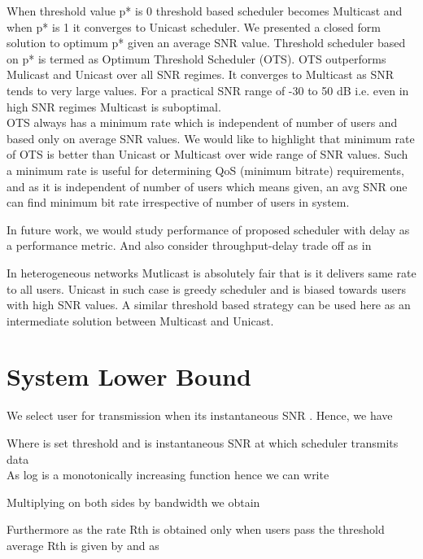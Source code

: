 \documentclass[conference]{IEEEtran}
\begin{document}
When threshold value p* is 0 threshold based scheduler becomes Multicast and when p* is 1 it converges to Unicast scheduler. We presented a closed form solution to optimum p* given an average SNR value. Threshold scheduler based on p* is termed as Optimum Threshold Scheduler (OTS). OTS outperforms Mulicast and Unicast over all SNR regimes. It converges to Multicast as SNR tends to very large values.
For a practical SNR range of -30 to 50 dB     i.e. even in high SNR regimes Multicast is suboptimal. \\

OTS always has a minimum rate which is independent of number of users and based only on average SNR values. We would like to highlight that minimum rate of OTS is better than Unicast or Multicast over wide range of SNR values. Such a minimum rate is useful for determining QoS (minimum bitrate) requirements, and as it is independent of number of users which means given, an avg SNR one can find minimum bit rate irrespective of number of users in system.

In future work, we would study performance of proposed scheduler with delay as a performance metric. And also consider throughput-delay trade off as in \cite{Praveenkumar_throuputdelay}

In heterogeneous networks Mutlicast is absolutely fair that is it delivers same rate to all users. Unicast in such case is greedy scheduler and is biased towards users with high SNR values.  A similar threshold based strategy can be used here as an intermediate solution between Multicast and Unicast.




\nocite{OMS}
\appendix

\section{System Lower Bound}
\label{Appendix: lower bound}
We select user for transmission when its instantaneous SNR  .
Hence, we have 

Where   is set threshold and    is instantaneous SNR at which scheduler transmits data\\
As log is a monotonically increasing function hence we can write 


Multiplying on both sides by bandwidth  we obtain



Furthermore as the rate Rth is obtained only when users pass the threshold average Rth is given by 
 and as 
\end{document}
